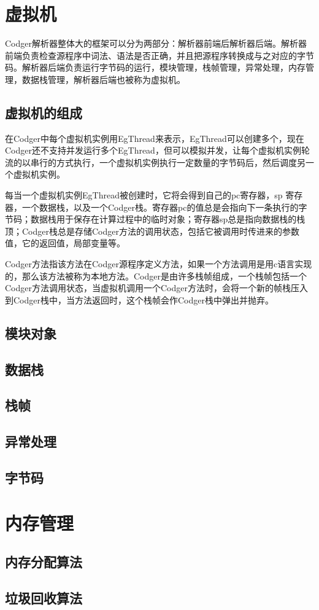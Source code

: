 \documentclass[a4paper,10pt]{article}
\begin{document}
\begin{CJK}{UTF8}{gbsn}
\section{虚拟机}
Codger解析器整体大的框架可以分为两部分：解析器前端后解析器后端。解析器前端负责检查源程序中词法、语法是否正确，并且把源程序转换成与之对应的字节码。解析器后端负责运行字节码的运行，模块管理，栈帧管理，异常处理，内存管理，数据栈管理，解析器后端也被称为虚拟机。
\subsection{虚拟机的组成}
在Codger中每个虚拟机实例用EgThread来表示，EgThread可以创建多个，现在Codger还不支持并发运行多个EgThread，但可以模拟并发，让每个虚拟机实例轮流的以串行的方式执行，一个虚拟机实例执行一定数量的字节码后，然后调度另一个虚拟机实例。

每当一个虚拟机实例EgThread被创建时，它将会得到自己的pc寄存器，sp 寄存器，一个数据栈，以及一个Codger栈。寄存器pc的值总是会指向下一条执行的字节码；数据栈用于保存在计算过程中的临时对象；寄存器sp总是指向数据栈的栈顶；Codger栈总是存储Codger方法的调用状态，包括它被调用时传进来的参数值，它的返回值，局部变量等。

Codger方法指该方法在Codger源程序定义方法，如果一个方法调用是用c语言实现的，那么该方法被称为本地方法。Codger是由许多栈帧组成，一个栈帧包括一个Codger方法调用状态，当虚拟机调用一个Codger方法时，会将一个新的帧栈压入到Codger栈中，当方法返回时，这个栈帧会作Codger栈中弹出并抛弃。
\subsection{模块对象}
\subsection{数据栈}
\subsection{栈帧}
\subsection{异常处理}
\subsection{字节码}
\section{内存管理}
\subsection{内存分配算法}
\subsection{垃圾回收算法}

\end{CJK}
\end{document}
